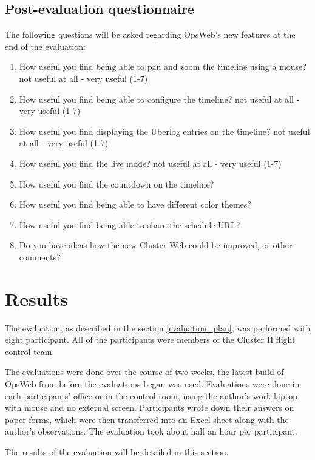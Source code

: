 \subsection{Post-evaluation questionnaire} \label{post-evaluation}
The following questions will be asked regarding OpsWeb's new features at the end of the evaluation:
\begin{enumerate}
\item How useful you find being able to pan and zoom the timeline using a mouse? not useful at all - very useful (1-7)
\item How useful you find being able to configure the timeline? not useful at all - very useful (1-7)
\item How useful you find displaying the Uberlog entries on the timeline? not useful at all - very useful (1-7)
\item How useful you find the live mode? not useful at all - very useful (1-7)
\item How useful you find the countdown on the timeline?
\item How useful you find being able to have different color themes?
\item How useful you find being able to share the schedule URL?
\item Do you have ideas how the new Cluster Web could be improved, or other comments?
\end{enumerate}

\section{Results}
The evaluation, as described in the section \ref{evaluation_plan}, was performed with eight participant. All of the participants were members of the Cluster II flight control team.

The evaluations were done over the course of two weeks, the latest build of OpsWeb from before the evaluations began was used. Evaluations were done in each participants' office or in the control room, using the author's work laptop with mouse and no external screen. Participants wrote down their answers on paper forms, which were then transferred into an Excel sheet along with the author's observations. The evaluation took about half an hour per participant.

The results of the evaluation will be detailed in this section.